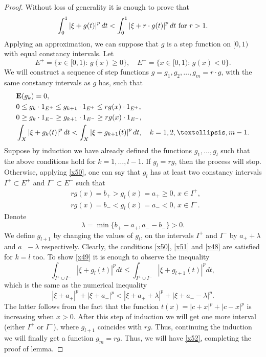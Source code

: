 \documentclass[12pt,reqno,fleqn]{amsart}
\theoremstyle{definition}
\theoremstyle{definition}
\theoremstyle{remark}
\def\ZI{\ensuremath{\textbf 1}}
\def\ZE{\ensuremath{\mathbf E}}
\numberwithin{equation}{section}
\newcommand {\e }[1]{\eqref{#1}}
\begin{document}
\begin{proof}
Without loss of generality it is enough to prove that 
\begin{equation}\label{x52}
	\int_0^1\left|\xi+g(t)\right|^pdt<\int_0^1\left|\xi+r\cdot g(t)\right|^pdt\hbox{ for }r>1.
\end{equation}
Applying an approximation, we can suppose that $g$ is a step function on $[0,1)$ with equal constancy intervals. Let 
\begin{equation}
	E^+=\{x\in [0,1):\, g(x)\ge 0\},\quad E^-=\{x\in [0,1):\, g(x)<0\}.
\end{equation}
We will construct a sequence of step functions $g=g_1, g_2,\ldots, g_m=r\cdot g$, with the same constancy intervals as $g$ has, such that  
\begin{align}
	&\ZE(g_k)=0,\label{x50}\\
	&0\le g_k\cdot \ZI_{E^+}\le g_{k+1}\cdot \ZI_{E^+}\le rg(x)\cdot \ZI_{E^+},\label{x51}\\ 
	&0\ge  g_k\cdot \ZI_{E^-}\ge g_{k+1}\cdot \ZI_{E^-}\ge rg(x)\cdot \ZI_{E^-},\label{x48}\\
	&\int_X\left|\xi+g_k(t)\right|^pdt< \int_X\left|\xi+g_{k+1}(t)\right|^pdt,\quad k=1,2,\ldots, m-1.\label{x49}
\end{align}
Suppose by induction we have already defined the functions $g_1,\ldots, g_l$ such that the above conditions hold for $k=1,\ldots, l-1$. If $g_l=rg$, then the process will stop. Otherwise, applying \e{x50}, one can say that $g_l$ has at least two constancy intervals $I^+\subset E^+$ and $I^-\subset E^-$ such that
\begin{align}
	&rg(x)=b_+>g_l(x)=a_+\ge 0,\, x\in I^+,\\
	 &rg(x)=b_-<g_l(x)=a_-<0,\, x\in I^-.
\end{align}
Denote 
\begin{equation}
	\lambda=\min\{b_+- a_+, a_--b_-\}>0.
\end{equation}
We define $g_{l+1}$ by changing the values of $g_l$, on the intervals $I^+$ and $I^-$ by $a_++\lambda$ and $a_--\lambda$ respectively. Clearly, the conditions \e{x50}, \e{x51} and \e{x48} are satisfied for $k=l$ too. To show \e{x49} it is enough to observe the inequality
\begin{equation*}
	\int_{I^+\cup I^-}\left|\xi+g_l(t)\right|^pdt\le \int_{I^+\cup I^-}\left|\xi+g_{l+1}(t)\right|^pdt,
\end{equation*}
which is the same as the numerical inequality
\begin{equation*}
	|\xi+a_+|^p+|\xi+a_-|^p<|\xi+a_++\lambda|^p+|\xi+a_--\lambda|^p.
\end{equation*}
The latter follows from the fact that the function $t(x)=|c+x|^p+|c-x|^p$ is increasing when $x>0$. After this step of induction we will get one more interval (either $I^+$ or $I^-$), where $g_{l+1}$ coincides with $rg$. Thus, continuing the induction we will finally get a function $g_m=rg$. Thus, we will have \e{x52}, completing the proof of lemma.
\end{proof}
\end{document}
